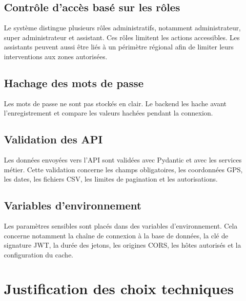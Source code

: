 \subsection{Contrôle d'accès basé sur les rôles}

Le système distingue plusieurs rôles administratifs, notamment administrateur, super administrateur et
assistant. Ces rôles limitent les actions accessibles. Les assistants peuvent aussi être liés à un périmètre
régional afin de limiter leurs interventions aux zones autorisées.

\subsection{Hachage des mots de passe}

Les mots de passe ne sont pas stockés en clair. Le backend les hache avant l'enregistrement et compare
les valeurs hachées pendant la connexion.

\subsection{Validation des API}

Les données envoyées vers l'API sont validées avec Pydantic et avec les services métier. Cette validation
concerne les champs obligatoires, les coordonnées GPS, les dates, les fichiers CSV, les limites de
pagination et les autorisations.

\subsection{Variables d'environnement}

Les paramètres sensibles sont placés dans des variables d'environnement. Cela concerne notamment la
chaîne de connexion à la base de données, la clé de signature JWT, la durée des jetons, les origines CORS,
les hôtes autorisés et la configuration du cache.

\section{Justification des choix techniques}

